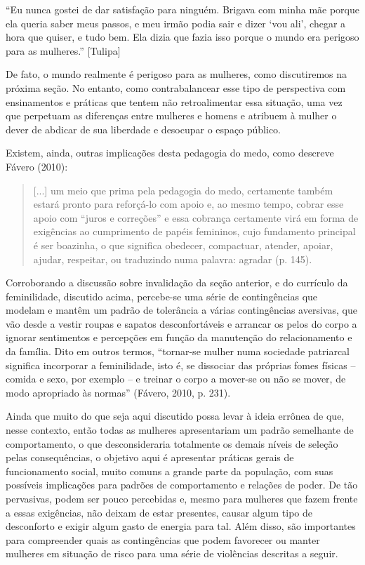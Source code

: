 ``Eu nunca gostei de dar satisfação para ninguém. Brigava com minha mãe porque ela queria saber meus passos, e meu irmão podia sair e dizer ‘vou ali’, chegar a hora que quiser, e tudo bem. Ela dizia que fazia isso porque o mundo era perigoso para as mulheres.'' [Tulipa]

De fato, o mundo realmente é perigoso para as mulheres, como discutiremos na próxima seção. No entanto, como contrabalancear esse tipo de perspectiva com ensinamentos e práticas que tentem não retroalimentar essa situação, uma vez que perpetuam as diferenças entre mulheres e homens e atribuem à mulher o dever de abdicar de sua liberdade e desocupar o espaço público.

Existem, ainda, outras implicações desta pedagogia do medo, como descreve Fávero (2010): 

\begin{quote}
    [...] um meio que prima pela pedagogia do medo, certamente também estará pronto para reforçá-lo com apoio e, ao mesmo tempo, cobrar esse apoio com ``juros e correções'' e essa cobrança certamente virá em forma de exigências ao cumprimento de papéis femininos, cujo fundamento principal é ser boazinha, o que significa obedecer, compactuar, atender, apoiar, ajudar, respeitar, ou traduzindo numa palavra: agradar (p. 145). 
\end{quote}

Corroborando a discussão sobre invalidação da seção anterior, e do currículo da feminilidade, discutido acima, percebe-se uma série de contingências que modelam e mantêm um padrão de tolerância a várias contingências aversivas, que vão desde a vestir roupas e sapatos desconfortáveis e arrancar os pelos do corpo a ignorar sentimentos e percepções em função da manutenção do relacionamento e da família. Dito em outros termos, ``tornar-se mulher numa sociedade patriarcal significa incorporar a feminilidade, isto é, se dissociar das próprias fomes físicas – comida e sexo, por exemplo – e treinar o corpo a mover-se ou não se mover, de modo apropriado às normas'' (Fávero, 2010, p. 231). 

Ainda que muito do que seja aqui discutido possa levar à ideia errônea de que, nesse contexto, então todas as mulheres apresentariam um padrão semelhante de comportamento, o que desconsideraria totalmente os demais níveis de seleção pelas consequências, o objetivo aqui é apresentar práticas gerais de funcionamento social, muito comuns a grande parte da população, com suas possíveis implicações para padrões de comportamento e relações de poder. De tão pervasivas, podem ser pouco percebidas e, mesmo para mulheres que fazem frente a essas exigências, não deixam de estar presentes, causar algum tipo de desconforto e exigir algum gasto de energia para tal. Além disso, são importantes para compreender quais as contingências que podem favorecer ou manter mulheres em situação de risco para uma série de violências descritas a seguir.

